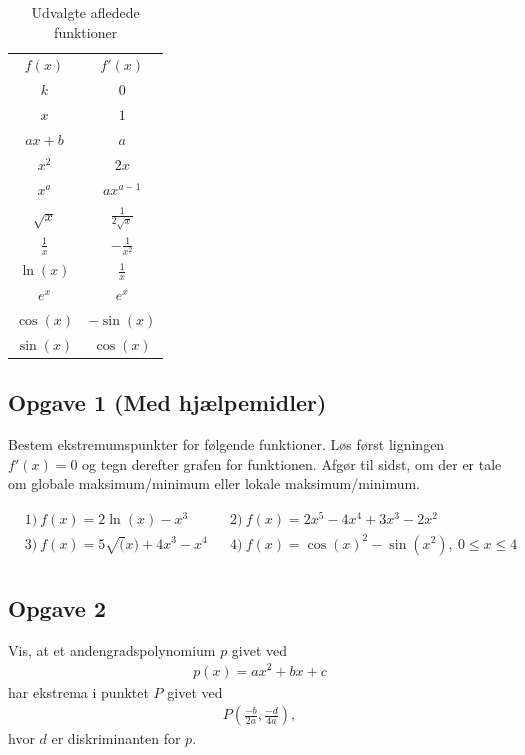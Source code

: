 \begin{table}[H]
	\centering
	\begin{tabular}{cc}
		$f(x)$ & $f'(x)$ \\
		$k$ & $0$ \\
		$x$ & $1$ \\
		$ax + b$  & $a$ \\
		$x^2$ & $2x$ \\
		$x^a$ & $ax^{a-1} $ \\
		$\sqrt{x}$ & $\frac{1}{2\sqrt{x}}$ \\
		$\frac{1}{x}$ & $-\frac{1}{x^2}$ \\
		$\ln(x)$ & $\frac{1}{x}$ \\
	 	$e^x$ & $e^x$ \\
	 	$\cos(x)$ & $-\sin(x)$ \\
	 	$\sin(x)$ & $\cos(x)$ \\
	\end{tabular}
	\caption{Udvalgte afledede funktioner}
	\label{tab:afledt}
\end{table}





\subsection*{Opgave 1 (Med hjælpemidler)}

Bestem ekstremumspunkter for følgende funktioner. Løs først ligningen $f'(x)=0$ og tegn derefter grafen for funktionen.  Afgør til sidst, om der er tale om globale maksimum/minimum eller lokale maksimum/minimum.

\begin{align*}
	&1) \ f(x) =  2\ln(x) - x^3    &&2) \ f(x) =   2x^5 - 4x^4 + 3x^3 - 2x^2    \\
	&3) \ f(x) = 5\sqrt(x) + 4x^3 - x^4    &&4) \ f(x) = \cos(x)^2 - \sin(x^2), \ 0 \leq x \leq 4    \\
\end{align*}


\subsection*{Opgave 2}
Vis, at et andengradspolynomium $p$ givet ved
\begin{align*}
	p(x) = ax^2 + bx + c
\end{align*}
har ekstrema i punktet $P$ givet ved
\begin{align*}
	P\left(\frac{-b}{2a},\frac{-d}{4a}\right),
\end{align*}
hvor $d$ er diskriminanten for $p$. 

